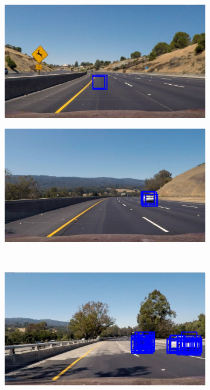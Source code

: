 \documentclass[a4paper, 11pt, DIV=14]{scrartcl}
\begin{document}
\begin{figure}[h]
    \centering
    \begin{subfigure}{0.45\textwidth}
        \includegraphics[width=\textwidth]{output_images/test2.jpg}
    \end{subfigure}\quad
    \begin{subfigure}{0.45\textwidth}
        \includegraphics[width=\textwidth]{output_images/test3.jpg}
    \end{subfigure} \\ \medskip
        \begin{subfigure}{0.45\textwidth}
        \includegraphics[width=\textwidth]{output_images/test4.jpg}

\end{subfigure}
\end{figure}
\end{document}
